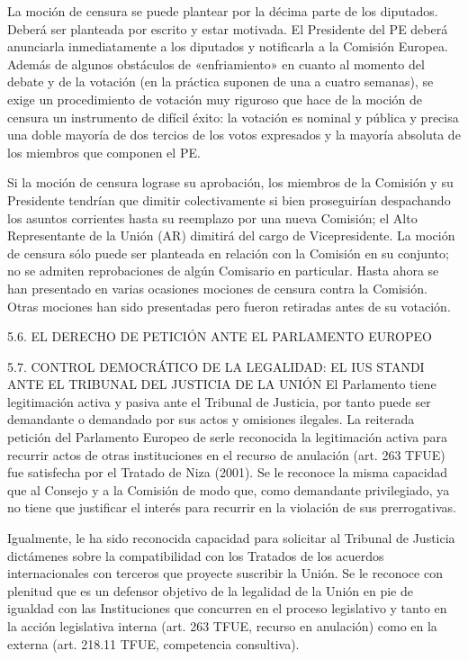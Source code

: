 \documentclass[10pt,a4paper]{article}
\begin{document}
La moción de censura se puede plantear por la décima parte de los diputados. Deberá ser planteada por escrito y estar motivada. El Presidente del PE deberá anunciarla inmediatamente a los diputados y notificarla a la Comisión Europea. Además de algunos obstáculos de «enfriamiento» en cuanto al momento del debate y de la votación (en la práctica suponen de una a cuatro semanas), se exige un procedimiento de votación muy riguroso que hace de la moción de censura un instrumento de difícil éxito: la votación es nominal y pública y precisa una doble mayoría de dos tercios de los votos expresados y la mayoría absoluta de los miembros que componen el PE.

Si la moción de censura lograse su aprobación, los miembros de la Comisión y su Presidente tendrían que dimitir colectivamente si bien proseguirían despachando los asuntos corrientes hasta su reemplazo por una nueva Comisión; el Alto Representante de la Unión (AR) dimitirá del cargo de Vicepresidente. La moción de censura sólo puede ser planteada en relación con la Comisión en su conjunto; no se admiten reprobaciones de algún Comisario en particular. Hasta ahora se han presentado en varias ocasiones mociones de censura contra la Comisión. Otras mociones han sido presentadas pero fueron retiradas antes de su votación.

5.6. EL DERECHO DE PETICIÓN ANTE EL PARLAMENTO EUROPEO

5.7. CONTROL DEMOCRÁTICO DE LA LEGALIDAD: EL IUS STANDI ANTE EL
TRIBUNAL DEL JUSTICIA DE LA UNIÓN
El Parlamento tiene legitimación activa y pasiva ante el Tribunal de Justicia, por tanto puede ser demandante o demandado por sus actos y omisiones ilegales. La reiterada petición del Parlamento Europeo de serle reconocida la legitimación activa para recurrir actos de otras instituciones en el recurso de anulación (art. 263 TFUE) fue satisfecha por el Tratado de Niza (2001). Se le reconoce la misma capacidad que al Consejo y a la Comisión de modo que, como demandante privilegiado, ya no tiene que justificar el interés para recurrir en la violación de sus prerrogativas.

Igualmente, le ha sido reconocida capacidad para solicitar al Tribunal de Justicia dictámenes sobre la compatibilidad con los Tratados de los acuerdos internacionales con terceros que proyecte suscribir la Unión. Se le reconoce con plenitud que es un defensor objetivo de la legalidad de la Unión en pie de igualdad con las Instituciones que concurren en el proceso legislativo y tanto en la acción legislativa interna (art. 263 TFUE, recurso en anulación) como en la externa (art. 218.11 TFUE, competencia consultiva).
\end{document}
